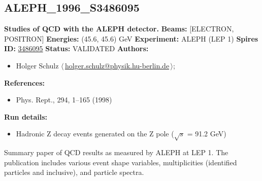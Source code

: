\subsection[ALEPH\_1996\_S3486095]{ALEPH\_1996\_S3486095\,\cite{Barate:1996fi}}
\textbf{Studies of QCD with the ALEPH detector.}\newline
\textbf{Beams:} [ELECTRON, POSITRON] \newline
\textbf{Energies:} (45.6, 45.6) GeV \newline
\textbf{Experiment:} ALEPH (LEP 1) \newline
\textbf{Spires ID:} \href{http://www.slac.stanford.edu/spires/find/hep/www?rawcmd=key+3486095}{3486095}\newline
\textbf{Status:} VALIDATED\newline
\textbf{Authors:}
\begin{itemize}
  \item Holger Schulz $\langle\,$\href{mailto:holger.schulz@physik.hu-berlin.de}{holger.schulz@physik.hu-berlin.de}$\,\rangle$;
\end{itemize}
\textbf{References:}
\begin{itemize}
  \item Phys. Rept., 294, 1--165 (1998)
\end{itemize}
\textbf{Run details:}
\begin{itemize}

  \item Hadronic Z decay events generated on the Z pole (\ensuremath{\sqrt{s}} = 91.2 GeV)\end{itemize}

\noindent Summary paper of QCD results as measured by ALEPH at LEP 1. The publication includes various event shape variables, multiplicities (identified particles and inclusive), and particle spectra.

\clearpage


\clearpage

